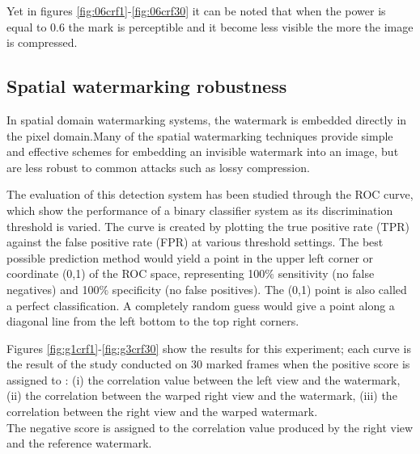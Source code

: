 Yet in figures \ref{fig:06crf1}-\ref{fig:06crf30} it can be noted that when the power is equal to 0.6 the mark is perceptible and it become less visible the more the image is compressed. 


\subsection{Spatial watermarking robustness}

In spatial domain watermarking systems, the watermark is embedded directly in the pixel domain.\newline  Many of the spatial watermarking techniques provide simple and effective schemes for embedding an invisible watermark into an image, but are less robust to common attacks such as lossy compression.

The evaluation of this detection system has been studied through the ROC curve, which show the performance of a binary classifier system as its discrimination threshold is varied. The curve is created by plotting the true positive rate (TPR) against the false positive rate (FPR) at various threshold settings. The best possible prediction method would yield a point in the upper left corner or coordinate (0,1) of the ROC space, representing 100$\%$ sensitivity (no false negatives) and 100$\%$ specificity (no false positives). The (0,1) point is also called a perfect classification. A completely random guess would give a point along a diagonal line from the left bottom to the top right corners.

Figures \ref{fig:g1crf1}-\ref{fig:g3crf30} show the results for this experiment; each curve is the result of the study conducted on 30 marked frames when the positive score is assigned to : (i) the correlation value between the left view and the watermark, (ii) the correlation between the warped right view and the watermark, (iii) the correlation between the right view and the warped watermark.\\ The negative score is assigned to the correlation value produced by the right view and the reference watermark.

